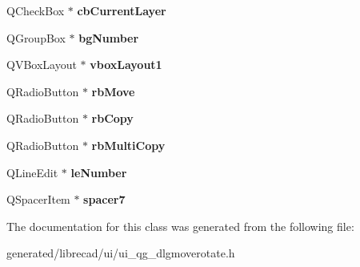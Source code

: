 \begin{DoxyCompactItemize}
\item 
\hypertarget{classUi__QG__DlgMoveRotate_ad3f8cc087cc6df014f48da171ec7e083}{Q\-Check\-Box $\ast$ {\bfseries cb\-Current\-Layer}}\label{classUi__QG__DlgMoveRotate_ad3f8cc087cc6df014f48da171ec7e083}

\item 
\hypertarget{classUi__QG__DlgMoveRotate_a5ac1c56bb9ee746f5695170ffe7f5290}{Q\-Group\-Box $\ast$ {\bfseries bg\-Number}}\label{classUi__QG__DlgMoveRotate_a5ac1c56bb9ee746f5695170ffe7f5290}

\item 
\hypertarget{classUi__QG__DlgMoveRotate_affee6e5be497193a99cc8049dd73051a}{Q\-V\-Box\-Layout $\ast$ {\bfseries vbox\-Layout1}}\label{classUi__QG__DlgMoveRotate_affee6e5be497193a99cc8049dd73051a}

\item 
\hypertarget{classUi__QG__DlgMoveRotate_a6a0b18125640a047a8b10288e5703e25}{Q\-Radio\-Button $\ast$ {\bfseries rb\-Move}}\label{classUi__QG__DlgMoveRotate_a6a0b18125640a047a8b10288e5703e25}

\item 
\hypertarget{classUi__QG__DlgMoveRotate_a12eb4ed4a4e5b285bff1447404f4bf11}{Q\-Radio\-Button $\ast$ {\bfseries rb\-Copy}}\label{classUi__QG__DlgMoveRotate_a12eb4ed4a4e5b285bff1447404f4bf11}

\item 
\hypertarget{classUi__QG__DlgMoveRotate_ab1daaaa15169cbb086915a2aa3c8524c}{Q\-Radio\-Button $\ast$ {\bfseries rb\-Multi\-Copy}}\label{classUi__QG__DlgMoveRotate_ab1daaaa15169cbb086915a2aa3c8524c}

\item 
\hypertarget{classUi__QG__DlgMoveRotate_a03ed3e89166995a021214234d413339b}{Q\-Line\-Edit $\ast$ {\bfseries le\-Number}}\label{classUi__QG__DlgMoveRotate_a03ed3e89166995a021214234d413339b}

\item 
\hypertarget{classUi__QG__DlgMoveRotate_a89353f1a7ccac1e11b14d12a1704b39d}{Q\-Spacer\-Item $\ast$ {\bfseries spacer7}}\label{classUi__QG__DlgMoveRotate_a89353f1a7ccac1e11b14d12a1704b39d}

\end{DoxyCompactItemize}


The documentation for this class was generated from the following file\-:\begin{DoxyCompactItemize}
\item 
generated/librecad/ui/ui\-\_\-qg\-\_\-dlgmoverotate.\-h\end{DoxyCompactItemize}
